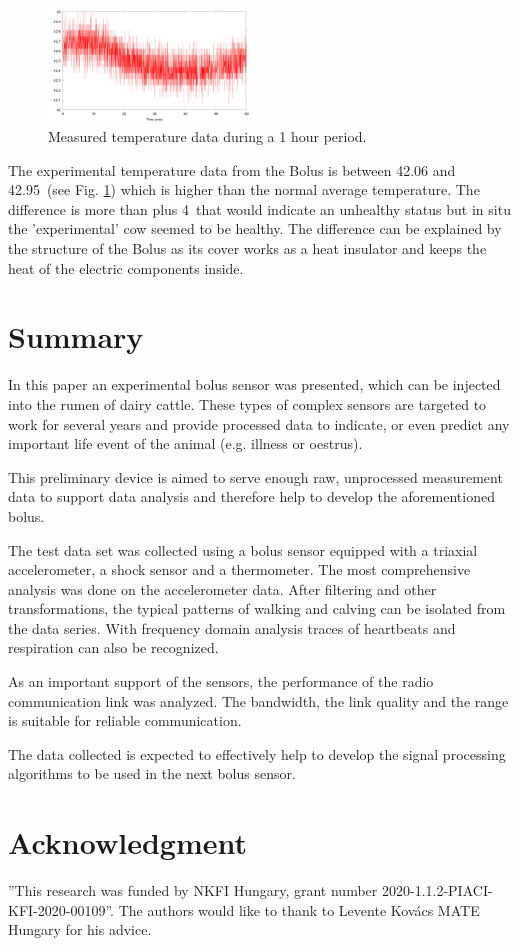 \documentclass[conference]{IEEEtran}
\begin{document}
\begin{figure}[htbp]
\centerline{\includegraphics[width=0.48\textwidth]{fig/temp-plot.png}}
  \caption{Measured temperature data during a 1 hour period.}
\label{temp-plot}
\end{figure}


The experimental temperature data from the Bolus is between 42.06 and 42.95\textcelsius\ (see Fig. \ref{temp-plot})
which is higher than the normal average temperature. The
difference is more than plus 4\textcelsius\  that would indicate an unhealthy
status but in situ the 'experimental' cow seemed to be healthy. The difference
can be explained by the structure of the Bolus as its cover works as a heat
insulator and keeps the heat of the electric components inside.

\section{Summary}

In this paper an experimental bolus sensor was presented, which can be injected
into the rumen of dairy cattle. These types of complex sensors are targeted
to work for several years and provide processed data to indicate, or even
predict any important life event of the animal (e.g. illness or oestrus).

This preliminary device is aimed to serve enough raw, unprocessed measurement
data to support data analysis and therefore help to develop the aforementioned
bolus.

The test data set was collected using a bolus sensor equipped with a triaxial
accelerometer, a shock sensor and a thermometer. The most comprehensive analysis
was done on the accelerometer data. After filtering and other transformations,
the typical patterns of walking and calving
can be isolated from the data series. With frequency domain analysis traces of
heartbeats and respiration can also be recognized.

As an important support of the
sensors, the performance of the radio communication link was analyzed. The bandwidth,
the link quality and the range is suitable for reliable communication.

The data collected is expected to effectively help to develop the signal processing
algorithms to be used in the next bolus sensor.

\section*{Acknowledgment}

''This research was funded by NKFI Hungary, grant number
2020-1.1.2-PIACI-KFI-2020-00109''. The authors would like to thank to Levente Kovács
MATE Hungary for his advice.



\end{document}
